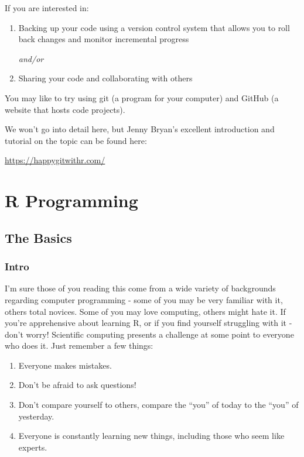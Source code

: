 \documentclass[
  letterpaper,
  DIV=11,
  numbers=noendperiod]{scrreprt}
\providecommand{\tightlist}{%
  \setlength{\itemsep}{0pt}\setlength{\parskip}{0pt}}\usepackage{longtable,booktabs,array}
\begin{document}
If you are interested in:

\begin{enumerate}
\def\labelenumi{\arabic{enumi}.}
\item
  Backing up your code using a version control system that allows you to
  roll back changes and monitor incremental progress

  \emph{and/or}
\item
  Sharing your code and collaborating with others
\end{enumerate}

You may like to try using git (a program for your computer) and GitHub
(a website that hosts code projects).

We won't go into detail here, but Jenny Bryan's excellent introduction
and tutorial on the topic can be found here:

\url{https://happygitwithr.com/}

\part{R Programming}

\chapter{The Basics}\label{the-basics}

\section{Intro}\label{intro}

I'm sure those of you reading this come from a wide variety of
backgrounds regarding computer programming - some of you may be very
familiar with it, others total novices. Some of you may love computing,
others might hate it. If you're apprehensive about learning R, or if you
find yourself struggling with it - don't worry! Scientific computing
presents a challenge at some point to everyone who does it. Just
remember a few things:

\begin{enumerate}
\def\labelenumi{\arabic{enumi}.}
\tightlist
\item
  Everyone makes mistakes.
\item
  Don't be afraid to ask questions!
\item
  Don't compare yourself to others, compare the ``you'' of today to the
  ``you'' of yesterday.
\item
  Everyone is constantly learning new things, including those who seem
  like experts.
\end{enumerate}
\end{document}
